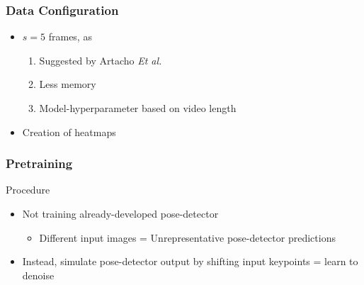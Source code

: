 \documentclass{beamer}
\begin{document}
\begin{frame}
    \frametitle{Data Configuration}
    \begin{itemize}
        \item<1-> $s = 5$ frames, as 
        \begin{enumerate}
            \item<1-> Suggested by Artacho \textit{Et al.}
            \item<1-> Less memory
            \item<1-> Model-hyperparameter based on video length
        \end{enumerate}
        \item<2-> Creation of heatmaps
    \end{itemize}

    
\end{frame}

\begin{frame}
    \frametitle{Pretraining}
    Procedure
    \begin{itemize}
        \item<1-> Not training already-developed pose-detector
        \begin{itemize}
            \item Different input images = Unrepresentative pose-detector predictions
        \end{itemize}
        \item<2-> Instead, simulate pose-detector output by shifting input keypoints = learn to denoise
    \end{itemize}
\end{frame}
\end{document}
